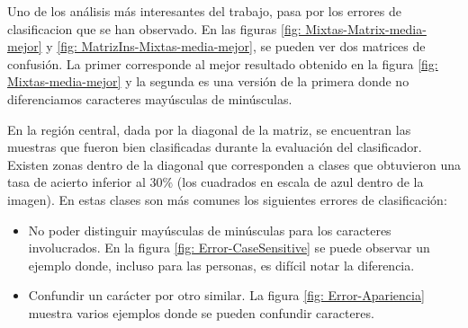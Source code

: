 	Uno de los análisis más interesantes del trabajo, pasa por los errores de clasificacion que se han observado. En las figuras \ref{fig: Mixtas-Matrix-media-mejor} y \ref{fig: MatrizIns-Mixtas-media-mejor}, se pueden ver dos matrices de confusión. La primer corresponde al mejor resultado obtenido en la figura \ref{fig: Mixtas-media-mejor} y la segunda es una versión de la primera donde no diferenciamos caracteres mayúsculas de minúsculas.
	
	En la región central, dada por la diagonal de la matriz, se encuentran las muestras que fueron bien clasificadas durante la evaluación del clasificador. Existen zonas dentro de la diagonal que corresponden a clases que obtuvieron una tasa de acierto inferior al $30\%$ (los cuadrados en escala de azul dentro de la imagen). En estas clases son más comunes los siguientes errores de clasificación: 
	
	\begin{itemize}
		\item No poder distinguir mayúsculas de minúsculas para los caracteres involucrados. En la figura \ref{fig: Error-CaseSensitive} se puede observar un ejemplo donde, incluso para las personas, es difícil notar la diferencia.
		\item Confundir un carácter por otro similar. La figura \ref{fig: Error-Apariencia} muestra varios ejemplos donde se pueden confundir caracteres.
	\end{itemize}		
	
